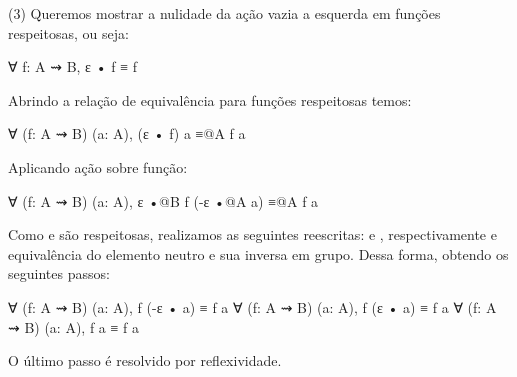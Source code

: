 \begin{description}
	(3) Queremos mostrar a nulidade da ação vazia a esquerda em funções respeitosas, ou seja:
	\begin{coqcode}
∀ f: A ⇝ B, ɛ • f ≡ f
	\end{coqcode}
	Abrindo a relação de equivalência para funções respeitosas temos:
	\begin{coqcode}
∀ (f: A ⇝ B) (a: A), (ɛ • f) a ≡@{A} f a
	\end{coqcode}
	Aplicando ação sobre função:
	\begin{coqcode}
∀ (f: A ⇝ B) (a: A), ɛ •@{B} f (-ɛ •@{A} a) ≡@{A} f a
	\end{coqcode}
	Como  e  são respeitosas, realizamos as seguintes reescritas:  e , respectivamente  e equivalência do elemento neutro e sua inversa em grupo. Dessa forma, obtendo os seguintes passos:
	\begin{coqcode}
∀ (f: A ⇝ B) (a: A), f (-ɛ • a) ≡ f a
∀ (f: A ⇝ B) (a: A), f (ɛ • a) ≡ f a
∀ (f: A ⇝ B) (a: A), f a ≡ f a
	\end{coqcode}
	O último passo é resolvido por reflexividade.	
\end{description}
